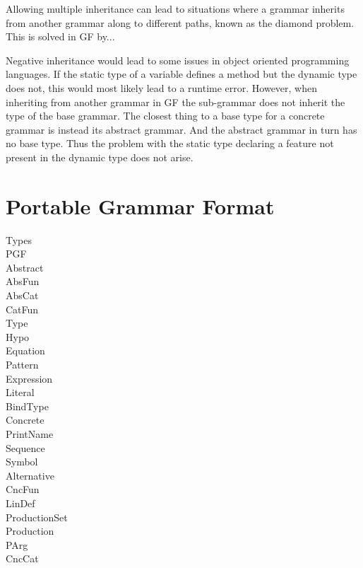 Allowing multiple inheritance can lead to situations where a grammar inherits from another grammar along to different paths, known as the diamond problem. This is solved in GF by...

Negative inheritance would lead to some issues in object oriented programming languages. If the static type of a variable defines a method but the dynamic type does not, this would most likely lead to a runtime error. However, when inheriting from another grammar in GF the sub-grammar does not inherit the type of the base grammar. The closest thing to a base type for a concrete grammar is instead its abstract grammar. And the abstract grammar in turn has no base type. Thus the problem with the static type declaring a feature not present in the dynamic type does not arise.

\section{Portable Grammar Format}
\label{sec:pgf}

\begin{description}
\item[Types]
\item[PGF]
\item[Abstract]
\item[AbsFun]
\item[AbsCat]
\item[CatFun]
\item[Type]
\item[Hypo]
\item[Equation]
\item[Pattern]
\item[Expression]
\item[Literal]
\item[BindType]
\item[Concrete]
\item[PrintName]
\item[Sequence]
\item[Symbol]
\item[Alternative]
\item[CncFun]
\item[LinDef]
\item[ProductionSet]
\item[Production]
\item[PArg]
\item[CncCat]
\end{description}
